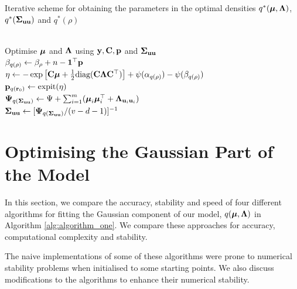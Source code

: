 \documentclass{amsart}[12pt]
\begin{document}
\begin{algorithm}
	\caption[Algorithm 1]{Iterative scheme for obtaining the parameters in the
		optimal densities $q^*({\boldsymbol \mu}, {\boldsymbol \Lambda})$, $q^*({\boldsymbol \Sigma}_{{\bf u} {\bf u}})$ and $q^*(\rho)$}
	\label{alg:algorithm_one}
	\begin{algorithmic}
		 \\[1ex]
		\STATE Optimise ${\boldsymbol \mu}$ and ${\boldsymbol \Lambda}$ using ${\bf y}, {\bf C}, {\bf p}$ and ${\boldsymbol \Sigma}_{{\bf u} {\bf u}}$ \\[1ex]
		\STATE $\beta_{q(\rho)} \leftarrow \beta_\rho + n - {\bf 1}^\top{\bf p}$ \\[1ex]
		\STATE $\eta \leftarrow -\exp \left [ {\bf C} {\boldsymbol \mu} + \tfrac{1}{2} \text{diag}{({\bf C}{\boldsymbol\Lambda}{\bf C}^\top)} \right ] + \psi{(\alpha_{q{(\rho)}})} - \psi{(\beta_{q{(\rho)}})}$ \\[1ex]
			\STATE ${\bf p}_{q({\bf r}_0)} \leftarrow \text{expit} (\eta)$ \\[1ex]
			\STATE ${\boldsymbol \Psi}_{q({\boldsymbol \Sigma}_{{\bf u} {\bf u}})} \leftarrow \Psi + \sum_{i=1}^m ({\boldsymbol \mu}_i {\boldsymbol \mu}_i^\top + {\boldsymbol \Lambda}_{{{\bf u}}_i {{\bf u}}_i})$ \\[1ex]
			\STATE ${\boldsymbol \Sigma}_{{\bf u}{\bf u}} \leftarrow [{\boldsymbol \Psi}_{q({\boldsymbol \Sigma}_{{\bf u} {\bf u}})}/(v - d - 1)]^{-1}$
			\ENDWHILE
			\end{algorithmic}
			\end{algorithm}
						
			\section{Optimising the Gaussian Part of the Model}
			\label{sec:gaussian}
					
			In this section, we compare the accuracy, stability and speed of four different algorithms for fitting
			the Gaussian component of our model, $q({\boldsymbol \mu}, {\boldsymbol \Lambda})$ in Algorithm \ref{alg:algorithm_one}.  We
			compare these approaches for accuracy, computational complexity and stability.

			The naive implementations of some of these algorithms were prone to numerical stability problems when
			initialised to some starting points. We also discuss modifications to the algorithms to enhance their
			numerical stability.
				
\end{document}
